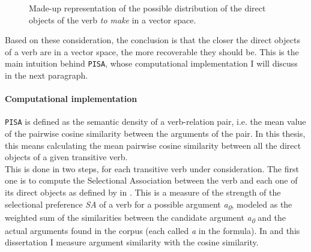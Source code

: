 \begin{figure}[htb]
\caption{Made-up representation of the possible distribution of the direct objects of the verb \textit{to make} in a vector space.}
\centering
{}
\end{figure}

Based on these consideration, the conclusion is that the closer the direct objects of a verb are in a vector space, the more recoverable they should be. This is the main intuition behind \texttt{PISA}, whose computational implementation I will discuss in the next paragraph.

\paragraph{Computational implementation} \texttt{PISA} is defined as the semantic density of a verb-relation pair, i.e. the mean value of the pairwise cosine similarity between the arguments of the pair. In this thesis, this means calculating the mean pairwise cosine similarity between all the direct objects of a given transitive verb.\\
This is done in two steps, for each transitive verb under consideration. The first one is to compute the Selectional Association between the verb and each one of its direct objects as defined by \textcite{Erk2007, ErkEtAl2010} in . This is a measure of the strength of the selectional preference \textit{SA} of a verb for a possible argument \textit{a\textsubscript{0}}, modeled as the weighted sum of the similarities between the candidate argument \textit{a\textsubscript{0}} and the actual arguments found in the corpus (each called \textit{a} in the formula). In \textcite{CappelliLenciPISA} and this dissertation I measure argument similarity with the cosine similarity.

